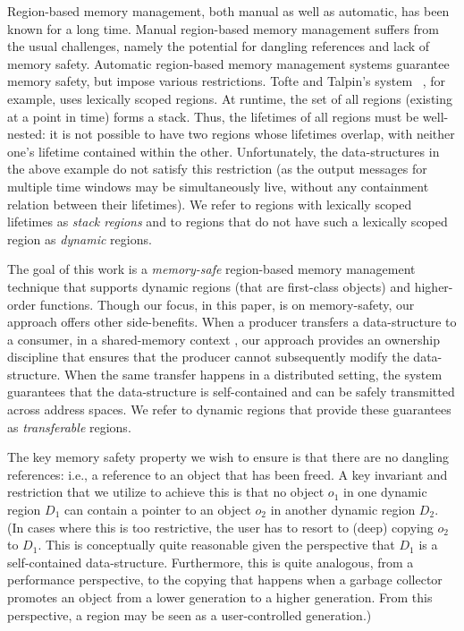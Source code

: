 Region-based memory management, both manual as well as automatic, has been known for
a long time. Manual region-based memory management suffers from the usual challenges,
namely the potential for dangling references and lack of memory safety. Automatic
region-based memory management systems guarantee memory safety, but impose various restrictions.
Tofte and Talpin's system~\cite{tofte94,tofte97} , for example, uses lexically scoped regions.
At runtime, the set of all regions (existing at a point in time) forms a stack. Thus, the lifetimes of
all regions must be well-nested: it is not possible to have two regions whose lifetimes
overlap, with neither one's lifetime contained within the other.
Unfortunately, the data-structures in the above example do not satisfy this restriction
(as the output messages for multiple time windows may be simultaneously live, without
any containment relation between their lifetimes).
We refer to regions with lexically scoped lifetimes as \emph{stack regions} and to regions 
that do not have such a lexically scoped region as \emph{dynamic} regions.

The goal of this work is a \emph{memory-safe} region-based memory management technique
that supports dynamic regions (that are first-class objects) and higher-order functions.
Though our focus, in this paper, is on memory-safety, our approach offers other side-benefits.
When a producer transfers a data-structure to a consumer, in a shared-memory context , our approach
provides an ownership discipline that ensures that the producer cannot subsequently modify
the data-structure. When the same transfer happens in a distributed setting, the system guarantees
that the data-structure is self-contained and can be safely transmitted across address spaces.
We refer to dynamic regions that provide these guarantees as \emph{transferable} regions.

The key memory safety property we wish to ensure is that there are no dangling references:
i.e., a reference to an object that has been freed.
A key invariant and restriction that we utilize to achieve this is that no object $o_1$ in one dynamic
region $D_1$ can contain a pointer to an object $o_2$ in another dynamic region $D_2$.
(In cases where this is too restrictive, the user has to resort to (deep) copying $o_2$ to $D_1$.
This is conceptually quite reasonable given the perspective that $D_1$ is a self-contained data-structure.
Furthermore, this is quite analogous, from a performance perspective, to the copying that happens
when a garbage collector promotes an object from a lower generation to a higher generation.
From this perspective, a region may be seen as a user-controlled generation.)

